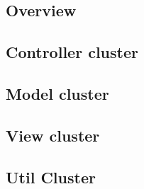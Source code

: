 \subsection{Overview}

\subsection{Controller cluster}

\subsection{Model cluster}

\subsection{View cluster}

\subsection{Util Cluster}

